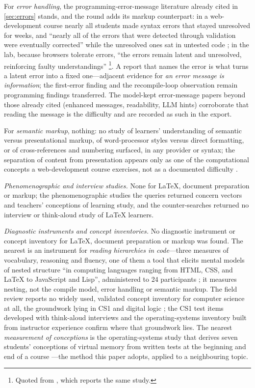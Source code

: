 For \emph{error handling}, the programming-error-message literature already
cited in \cref{sec:errors} stands, and the round adds its markup
counterpart: in a web-development course nearly all students made
syntax errors that stayed unresolved for weeks, and \enquote{nearly all
of the errors that were detected through validation were eventually
corrected} while the unresolved ones sat in untested code
\autocite{Park2015SyntaxErrors}; in the lab, because browsers tolerate
errors, \enquote{the errors remain latent and unresolved, reinforcing
faulty understandings} \autocite{Park2013ErrorTaxonomy}\footnote{Quoted
from \textcite[pp.~107--108]{Park2014openHTML}, which reports the same
study.}.
A report that names the error is what turns a latent error into a fixed
one---adjacent evidence for \emph{an error message is information}; the
first-error finding \autocite{Munson2016CompilerErrors} and the
recompile-loop observation remain programming findings transferred.
The model-kept error-message papers beyond those already cited (enhanced
messages, readability, LLM hints) corroborate that reading the message
is the difficulty and are recorded as such in the export.

For \emph{semantic markup}, nothing: no study of learners' understanding
of semantic versus presentational markup, of word-processor styles versus
direct formatting, or of cross-references and numbering surfaced, in any
provider or syntax; the separation of content from presentation appears
only as one of the computational concepts a web-development course
exercises, not as a documented difficulty \autocite{Park2011WebDev}.

\emph{Phenomenographic and interview studies.}
None for LaTeX, document preparation or markup; the phenomenographic
studies the queries returned concern vectors and teachers' conceptions of
learning study, and the counter-searches returned no interview or
think-aloud study of LaTeX learners.

\emph{Diagnostic instruments and concept inventories.}
No diagnostic instrument or concept inventory for LaTeX, document
preparation or markup was found.
The nearest is an instrument for \emph{reading hierarchies in code}---three
measures of vocabulary, reasoning and fluency, one of them a tool that
elicits mental models of nested structure \enquote{in computing languages
ranging from HTML, CSS, and LaTeX to JavaScript and Lisp}, administered to
24 participants \autocite{Park2016Hierarchies}; it measures nesting, not
the compile model, error handling or semantic markup.
The field review reports no widely used, validated concept inventory for
computer science at all, the groundwork lying in CS1 and digital logic
\autocite{Taylor2014CI}; the CS1 test items developed with think-aloud
interviews \autocite{Vahrenhold2014TestItems} and the operating-systems
inventory built from instructor experience \autocite{WebbTaylor2014OSCI}
confirm where that groundwork lies.
The nearest \emph{measurement of conceptions} is the operating-systems
study that derives seven students' conceptions of virtual memory from
written tests at the beginning and end of a course
\autocite{Pamplona2024VirtualMemory}---the method this paper adopts,
applied to a neighbouring topic.


